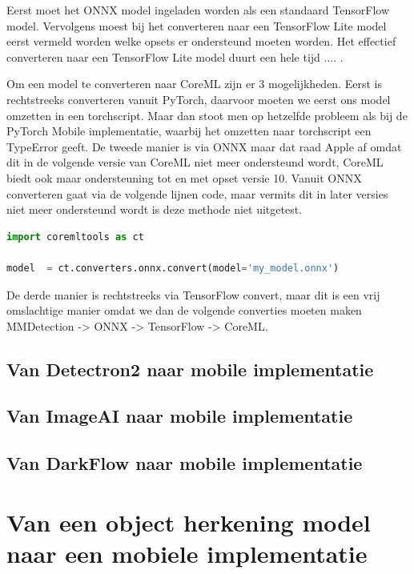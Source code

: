 Eerst moet het ONNX model ingeladen worden als een standaard TensorFlow model.
Vervolgens moest bij het converteren naar een TensorFlow Lite model eerst vermeld worden welke opsets er ondersteund moeten worden.
Het effectief converteren naar een TensorFlow Lite model duurt een hele tijd .... .

Om een model te converteren naar CoreML zijn er 3 mogelijkheden.
Eerst is rechtstreeks converteren vanuit PyTorch, daarvoor moeten we eerst ons model omzetten in een torchscript.
Maar dan stoot men op hetzelfde probleem als bij de PyTorch Mobile implementatie, waarbij het omzetten naar torchscript een TypeError geeft.
De tweede manier is via ONNX maar dat raad Apple af omdat dit in de volgende versie van CoreML niet meer ondersteund wordt, CoreML biedt ook maar ondersteuning tot en met opset versie 10.
Vanuit ONNX converteren gaat via de volgende lijnen code, maar vermits dit in later versies niet meer ondersteund wordt is deze methode niet uitgetest.

\begin{lstlisting}[language=Python, caption=Converteren van ONNX bestand naar een CoreML model]
import coremltools as ct

model  = ct.converters.onnx.convert(model='my_model.onnx')
\end{lstlisting}

De derde manier is rechtstreeks via TensorFlow convert, maar dit is een vrij omslachtige manier omdat we dan de volgende converties moeten maken MMDetection -> ONNX -> TensorFlow -> CoreML.



\subsection{Van Detectron2 naar mobile implementatie}

\subsection{Van ImageAI naar mobile implementatie}

\subsection{Van DarkFlow naar mobile implementatie}


\section{Van een object herkening model naar een mobiele implementatie}

